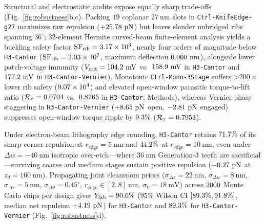 \documentclass[pdflatex,sn-nature]{sn-jnl}
\DeclareRobustCommand{\roundone}[1]{\fpeval{round(#1,1)}}
\DeclareRobustCommand{\roundtwo}[1]{\fpeval{round(#1,2)}}
\begin{document}
Structural and electrostatic audits expose equally sharp trade-offs (Fig.~\ref{fig:robustness}b,c). Packing $19$ coplanar $27\ \mathrm{nm}$ slots in \texttt{Ctrl-KnifeEdge-g27} maximizes raw repulsion ($+25.78{}\ \mathrm{pN}$) but leaves slender unbridged ribs spanning $36^\circ$; 32-element Hermite curved-beam finite-element analysis yields a buckling safety factor $\mathrm{SF}_{\mathrm{rib}} = 3.17\times 10^{3}{}$, nearly four orders of magnitude below \texttt{H3-Cantor} ($\mathrm{SF}_{\mathrm{rib}} = 2.03\times 10^{7}{}$, maximum deflection $0.000{}\ \mathrm{nm}$), alongside lower patch-voltage immunity ($V_{\mathrm{crit}} = 104.2{}\ \mathrm{mV}$ vs.\ $158.9{}\ \mathrm{mV}$ in \texttt{H3-Cantor} and $177.2{}\ \mathrm{mV}$ in \texttt{H3-Cantor-Vernier}). Monotonic \texttt{Ctrl-Mono-3Stage} suffers >$200\times$ lower rib safety ($9.07\times 10^{4}{}$) and elevated open-window parasitic torque-to-lift ratio ($\mathcal{R}_\tau = 0.0704{}$ vs.\ $0.8765{}$ in \texttt{H3-Cantor}; Methods), whereas Vernier phase staggering in \texttt{H3-Cantor-Vernier} ($+8.65{}\ \mathrm{pN}$ open, $-2.81{}\ \mathrm{pN}$ engaged) suppresses open-window torque ripple by $\roundone{\fpeval{(1 - \HthreeRobustTorqueRipple / \HthreeSymTorqueRipple) * 100}}\%$ ($\mathcal{R}_\tau = 0.7953{}$).

Under electron-beam lithography edge rounding, \texttt{H3-Cantor} retains $71.7{}\%$ of its sharp-corner repulsion at $r_{\mathrm{edge}}=5\ \mathrm{nm}$ and $44.2{}\%$ at $r_{\mathrm{edge}}=10\ \mathrm{nm}$; even under $\Delta w = -40\ \mathrm{nm}$ isotropic over-etch---where $36\ \mathrm{nm}$ Generation-3 teeth are sacrificial---surviving coarse and medium stages sustain positive repulsion ($+0.27{}\ \mathrm{pN}$ at $z_d = 160\ \mathrm{nm}$). Propagating joint cleanroom priors ($\sigma_{\Delta z}=22\ \mathrm{nm}$, $\sigma_{\Delta w}=8\ \mathrm{nm}$, $\sigma_{\Delta r}=5\ \mathrm{nm}$, $\sigma_{\Delta\theta}=0.45^\circ$, $r_{\mathrm{edge}} \in [2,8]\ \mathrm{nm}$, $\sigma_V = 18\ \mathrm{mV}$) across $2000{}$ Monte Carlo chips per design gives $Y_{\mathrm{lab}} = \roundone{\HthreeSymYieldPct}\%$ ($95\%$ Wilson CI $[89.3{}\%, 91.8{}\%]$, median net repulsion $+\roundtwo{\HthreeSymMedianMcFzPn}\ \mathrm{pN}$) for \texttt{H3-Cantor} and $89.3{}\%$ for \texttt{H3-Cantor-Vernier} (Fig.~\ref{fig:robustness}d).
\end{document}
